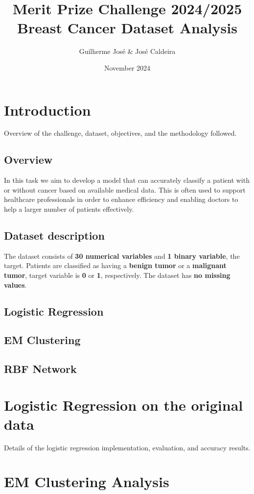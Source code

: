 \documentclass[a4paper,12pt]{article}
\title{Merit Prize Challenge 2024/2025 \\ \vspace{0.5cm} \large Breast Cancer Dataset Analysis}
\author{Guilherme José & José Caldeira}
\date{November 2024}
\begin{document}
\maketitle
\tableofcontents
\newpage

\section{Introduction}
\label{sec:introduction}
Overview of the challenge, dataset, objectives, and the methodology followed.

\subsection{Overview}
In this task we aim to develop a model that can accurately classify a patient with or without cancer based on available medical data. This is often used to support healthcare professionals in order to enhance efficiency and enabling doctors to help a larger number of patients effectively.
\subsection{Dataset description}
The dataset consists of \textbf{30 numerical variables} and \textbf{1 binary variable}, the target. Patients are classified as having a \textbf{benign tumor} or a \textbf{malignant tumor}, target variable is \textbf{0} or \textbf{1}, respectively. The dataset has \textbf{no missing values}.
\subsection{Logistic Regression}
\subsection{EM Clustering}
\subsection{RBF Network}

\section{Logistic Regression on the original data}
\label{sec:logistic-regression-original}
Details of the logistic regression implementation, evaluation, and accuracy results.

\section{EM Clustering Analysis}
\label{sec:em-clustering}
\end{document}
